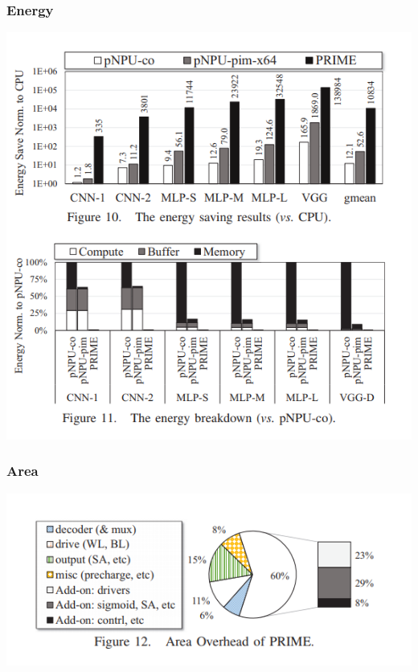 \documentclass[hyperref={colorlinks}]{beamer}
\begin{document}
\begin{frame}
	\frametitle{Energy}
	\includegraphics[scale=0.4, center]{energy.png}	
\end{frame}

\begin{frame}
	\frametitle{Area}
	\includegraphics[scale=0.5, center]{area.png}	
\end{frame}
\end{document}
